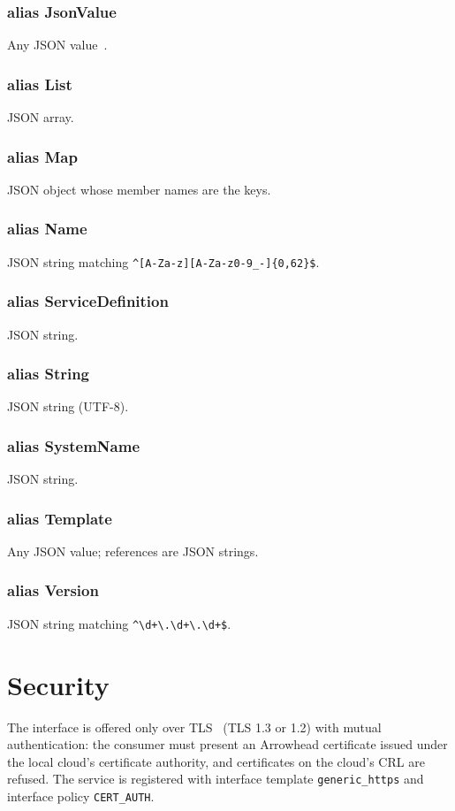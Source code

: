 \documentclass[a4paper]{arrowhead}
\newcommand{\pdef}[1]{{\textcolor{ArrowheadGrey}{#1\label{sec:model:primitives:#1}\label{sec:model:primitives:#1s}}}}
\begin{document}
\subsubsection*{alias \pdef{JsonValue}}
Any JSON value~\cite{rfc8259}.

\subsubsection*{alias \pdef{List}}
JSON array.

\subsubsection*{alias \pdef{Map}}
JSON object whose member names are the keys.

\subsubsection*{alias \pdef{Name}}
JSON string matching \texttt{\^{}[A-Za-z][A-Za-z0-9\_-]\{0,62\}\$}.

\subsubsection*{alias \pdef{ServiceDefinition}}
JSON string.

\subsubsection*{alias \pdef{String}}
JSON string (UTF-8).

\subsubsection*{alias \pdef{SystemName}}
JSON string.

\subsubsection*{alias \pdef{Template}}
Any JSON value; references are JSON strings.

\subsubsection*{alias \pdef{Version}}
JSON string matching \texttt{\^{}\textbackslash{}d+\textbackslash{}.\textbackslash{}d+\textbackslash{}.\textbackslash{}d+\$}.



\section{Security}
\label{sec:security}
The interface is offered only over TLS~\cite{rfc8446} (TLS 1.3 or 1.2) with mutual authentication: the consumer must
present an Arrowhead certificate issued under the local cloud's certificate authority, and certificates on the
cloud's CRL are refused. The service is registered with interface template \texttt{generic\_\allowbreak{}https} and interface
policy \texttt{CERT\_AUTH}.
\end{document}
